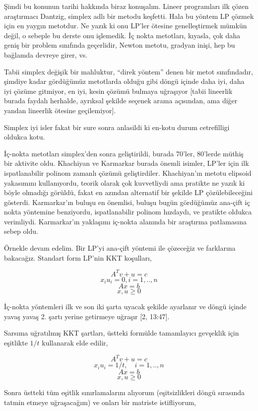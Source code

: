 \documentclass[12pt,fleqn]{article}\usepackage{../../common}
\begin{document}
Şimdi bu konunun tarihi hakkında biraz konuşalım. Lineer programları ilk
çözen araştırmacı Dantzig, simplex adlı bir metodu keşfetti. Hala bu yöntem
LP çözmek için en yaygın metotdur. Ne yazık ki onu LP'ler ötesine
genelleştirmek mümkün değil, o sebeple bu derste onu işlemedik. İç nokta
metotları, kıyasla, çok daha geniş bir problem sınıfında geçerlidir, Newton
metotu, gradyan inişi, hep bu bağlamda devreye girer, vs. 

Tabii simplex değişik bir mahluktur, ``direk yöntem'' denen bir metot
sınıfındadır, şimdiye kadar gördüğümüz metotlarda olduğu gibi döngü içinde
daha iyi, daha iyi çözüme gitmiyor, en iyi, kesin çözümü bulmaya uğraşıyor
[tabii lineerlik burada faydalı herhalde, ayrıksal şekilde seçenek arama
açısından, ama diğer yandan lineerlik ötesine geçilemiyor].

Simplex iyi isler fakat bir sure sonra anlasildi ki en-kotu durum
cetrefilligi oldukca kotu. 

İç-nokta metotları simplex'den sonra geliştirildi, burada 70'ler, 80'lerde
müthiş bir aktivite oldu. Khachiyan ve Karmarkar burada önemli isimler,
LP'ler için ilk ispatlanabilir polinom zamanlı çözümü
geliştirdiler. Khachiyan'ın metotu elipsoid yakasımını kullanıyordu, teorik
olarak çok kuvvetliydi ama pratikte ne yazık ki böyle olmadığı görüldü,
fakat en azından alternatif bir şekilde LP çözülebileceğini
gösterdi. Karmarkar'ın buluşu en önemlisi, buluşu bugün gördüğümüz ana-çift
iç nokta yöntemine benziyordu, ispatlanabilir polinom hızdaydı, ve pratikte
oldukca verimliydi. Karmarkar'ın yaklaşımı iç-nokta alanında bir
araştırma patlamasına sebep oldu.  

Örnekle devam edelim. Bir LP'yi ana-çift yöntemi ile çözeceğiz ve
farklarına bakacağız. Standart form LP'nin KKT koşulları,

$$
A^T v + u = c
$$
$$
x_i u_i = 0, i=1,..,n
$$
$$
Ax = b
$$
$$
x,u \ge 0
$$

İç-nokta yöntemleri ilk ve son iki şarta uyacak şekilde ayarlanır ve döngü
içinde yavaş yavaş 2. şartı yerine getirmeye uğraşır [2, 13:47]. 

Sarsıma uğratılmış KKT şartları, üstteki formülde tamamlayıcı gevşeklik için
eşitlikte $1/t$ kullanarak  elde edilir,

$$
A^T v + u = c
$$
$$
x_i u_i = 1/t, \quad i=1,..,n
$$
$$
Ax = b
$$
$$
x,u \ge 0
$$

Sonra üstteki tüm eşitlik sınırlamalarını alıyorum (eşitsizlikleri döngü
sırasında tatmin etmeye uğraşacağım) ve onları bir matriste istifliyorum,
\end{document}

